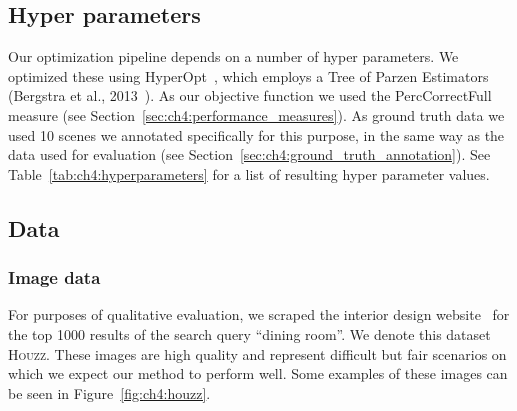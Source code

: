 \documentclass[10pt,twocolumn,letterpaper]{article}
\begin{document}
\subsection{Hyper parameters}
Our optimization pipeline depends on a number of hyper parameters. We optimized
these using HyperOpt~\cite{HyperOpt}, which employs a Tree of Parzen Estimators (Bergstra et al., 2013~\cite{Bergstra:2013:ICML}).
As our objective function we used the PercCorrectFull measure (see Section~\ref{sec:ch4:performance_measures}).
As ground truth data we used 10 scenes we annotated specifically for this purpose,
in the same way as the data used for evaluation (see Section~\ref{sec:ch4:ground_truth_annotation}).
See Table~\ref{tab:ch4:hyperparameters} for a list of resulting hyper parameter values.

\begin{table}
    \centering
    \caption[Hyper parameters]{Hyper parameters of optimization, found by HyperOpt~\cite{HyperOpt}}
    \label{tab:ch4:hyperparameters}
\end{table}

\subsection{Data}
\label{sec:ch4:training_data}
\subsubsection{Image data}
For purposes of qualitative evaluation, we scraped the
interior design website~\cite{Houzz} for the top 1000 results of the search
query ``dining room''. We denote this dataset \textsc{Houzz}.  These images are
high quality and represent difficult but fair scenarios on which we expect our
method to perform well. Some examples of these images can be seen in
Figure~\ref{fig:ch4:houzz}.
\end{document}
